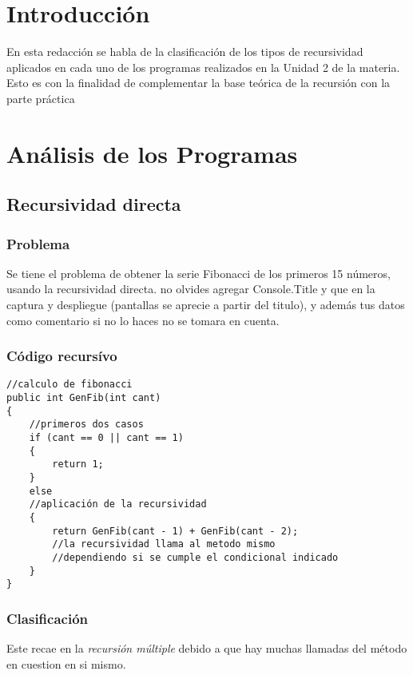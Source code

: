 \documentclass[letterpaper, 12pt]{article}
\begin{document}
    \newpage
    \begin{justify}
        \setcounter{page}{1}
        \thispagestyle{fancy}
        \section{Introducción}
        En esta redacción se habla de la clasificación de los tipos de recursividad aplicados en cada uno de los programas realizados en la Unidad 2 de la materia.
        Esto es con la finalidad de complementar la base teórica de la recursión con la parte práctica
        \section{Análisis de los Programas}
        \subsection{Recursividad directa}
            \subsubsection{Problema}
            Se tiene el problema de obtener la serie Fibonacci de los primeros 15 números, usando la recursividad directa.
            no olvides agregar Console.Title y que en la captura y despliegue (pantallas se aprecie a partir del titulo), y además tus datos como comentario
            si no lo haces no se tomara en cuenta.
            \subsubsection{Código recursívo}
\begin{verbatim}
//calculo de fibonacci
public int GenFib(int cant)
{
    //primeros dos casos
    if (cant == 0 || cant == 1)
    {
        return 1;
    }
    else
    //aplicación de la recursividad
    {
        return GenFib(cant - 1) + GenFib(cant - 2); 
        //la recursividad llama al metodo mismo
        //dependiendo si se cumple el condicional indicado
    }
}
\end{verbatim}
            \subsubsection{Clasificación}
            Este recae en la \emph{recursión múltiple} debido a que hay muchas llamadas del método en cuestion en si mismo.

\end{justify}
\end{document}

